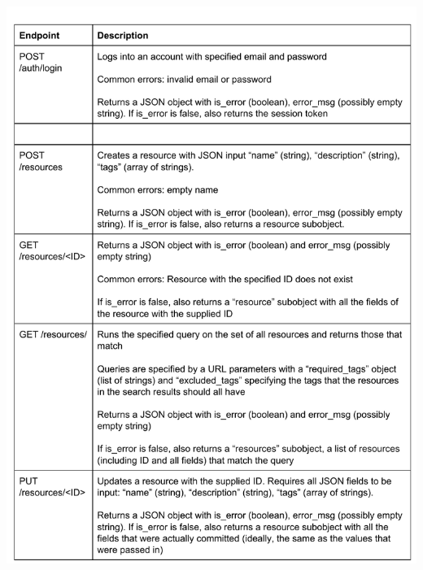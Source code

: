 \documentclass[12pt]{article}
\begin{document}
\includegraphics[width=6in]{../ev3/apispec_01.pdf}
\end{document}
